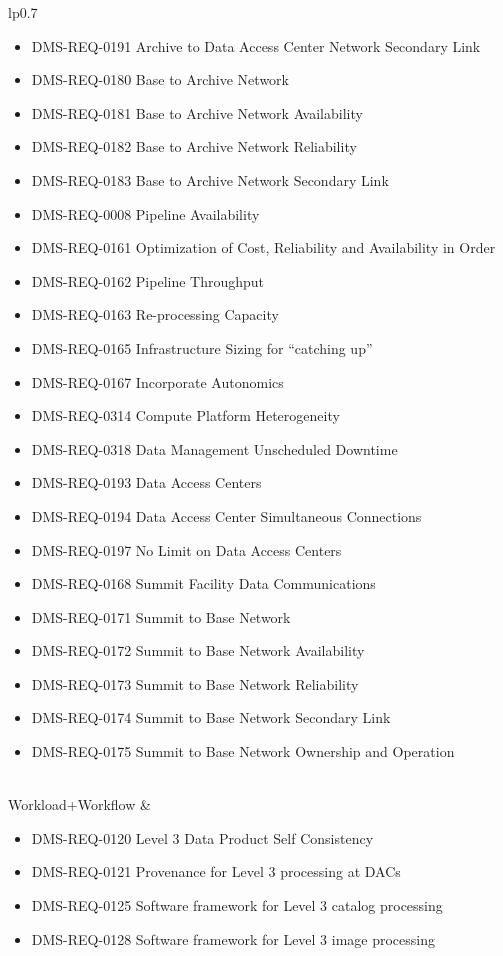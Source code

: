 \begin{xtabular}{lp{0.7\textwidth}}
\begin{itemize}
\item DMS-REQ-0191 Archive to Data Access Center Network Secondary Link
\item DMS-REQ-0180 Base to Archive Network
\item DMS-REQ-0181 Base to Archive Network Availability
\item DMS-REQ-0182 Base to Archive Network Reliability
\item DMS-REQ-0183 Base to Archive Network Secondary Link
\item DMS-REQ-0008 Pipeline Availability
\item DMS-REQ-0161 Optimization of Cost, Reliability and Availability in Order
\item DMS-REQ-0162 Pipeline Throughput
\item DMS-REQ-0163 Re-processing Capacity
\item DMS-REQ-0165 Infrastructure Sizing for ``catching up''
\item DMS-REQ-0167 Incorporate Autonomics
\item DMS-REQ-0314 Compute Platform Heterogeneity
\item DMS-REQ-0318 Data Management Unscheduled Downtime
\item DMS-REQ-0193 Data Access Centers
\item DMS-REQ-0194 Data Access Center Simultaneous Connections
\item DMS-REQ-0197 No Limit on Data Access Centers
\item DMS-REQ-0168 Summit Facility Data Communications
\item DMS-REQ-0171 Summit to Base Network
\item DMS-REQ-0172 Summit to Base Network Availability
\item DMS-REQ-0173 Summit to Base Network Reliability
\item DMS-REQ-0174 Summit to Base Network Secondary Link
\item DMS-REQ-0175 Summit to Base Network Ownership and Operation
\end{itemize} \\ \hline
Workload+Workflow &
\begin{itemize}
\item DMS-REQ-0120 Level 3 Data Product Self Consistency
\item DMS-REQ-0121 Provenance for Level 3 processing at DACs
\item DMS-REQ-0125 Software framework for Level 3 catalog processing
\item DMS-REQ-0128 Software framework for Level 3 image processing

\end{itemize}
\end{xtabular}
